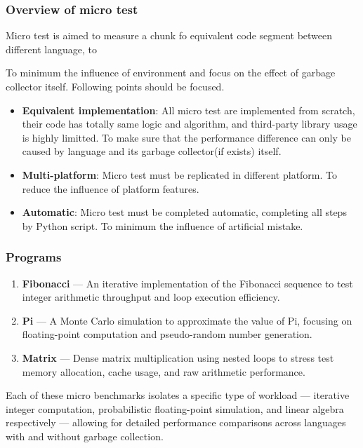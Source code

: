\subsubsection{Overview of micro test}
Micro test is aimed to measure a chunk fo equivalent code segment between different language, to 

To minimum the influence of environment and focus on the effect of garbage collector itself. Following points should be focused.

\begin{itemize}
    \item \textbf{Equivalent implementation}: All micro test are implemented from scratch, their code has totally same logic and algorithm, and third-party library usage is highly limitted. To make sure that the performance difference can only be caused by language and its garbage collector(if exists) itself.
    \item \textbf{Multi-platform}: Micro test must be replicated in different platform. To reduce the influence of platform features.
    \item \textbf{Automatic}: Micro test must be completed automatic, completing all steps by Python script. To minimum the influence of artificial mistake.
\end{itemize}


\subsubsection{Programs}
\begin{enumerate}
  \item \textbf{Fibonacci} — An iterative implementation of the Fibonacci sequence to test integer arithmetic throughput and loop execution efficiency.
  \item \textbf{Pi} — A Monte Carlo simulation to approximate the value of Pi, focusing on floating-point computation and pseudo-random number generation.
  \item \textbf{Matrix} — Dense matrix multiplication using nested loops to stress test memory allocation, cache usage, and raw arithmetic performance.
\end{enumerate}

Each of these micro benchmarks isolates a specific type of workload — iterative integer computation, probabilistic floating-point simulation, and linear algebra respectively — allowing for detailed performance comparisons across languages with and without garbage collection.

